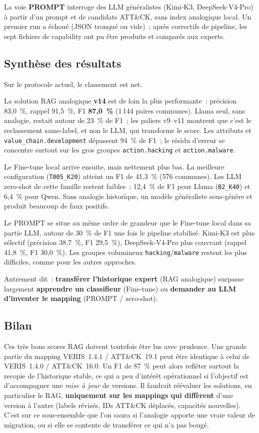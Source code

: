 \documentclass[a4paper,12pt]{article}
\begin{document}
La voie \textbf{PROMPT} interroge des LLM généralistes (Kimi-K3,
DeepSeek-V4-Pro) à partir d'un prompt et de candidats ATT\&CK, sans
index analogique local. Un premier run a échoué (JSON tronqué ou
vide)~; après correctifs de pipeline, les sept fichiers de capability
ont pu être produits et comparés aux experts.

\subsection{Synthèse des résultats}

Sur le protocole actuel, le classement est net.

La solution RAG analogique \textbf{v14} est de loin la plus
performante~: précision 83,0~\%, rappel 91,5~\%, F1 \textbf{87,0~\%}
(1\,144 paires communes). Llama seul, sans analogie, restait autour
de 23~\% de F1~; les paliers v9--v11 montrent que c'est le
reclassement same-label, et non le LLM, qui transforme le score. Les
attributs et \texttt{value\_chain.development} dépassent 94~\% de F1~;
le résidu d'erreur se concentre surtout sur les gros groupes
\texttt{action.hacking} et \texttt{action.malware}.

Le Fine-tune local arrive ensuite, mais nettement plus bas. La
meilleure configuration (\texttt{T005\_K20}) atteint un F1 de
41,3~\% (576 communes). Les LLM zero-shot de cette famille restent
faibles~: 12,4~\% de F1 pour Llama (\texttt{B2\_K40}) et 6,4~\% pour
Qwen. Sans analogie historique, un modèle généraliste sous-génère et
produit beaucoup de faux positifs.

Le PROMPT se situe au même ordre de grandeur que le Fine-tune local
dans sa partie LLM, autour de 30~\% de F1 une fois le pipeline
stabilisé. Kimi-K3 est plus sélectif (précision 38,7~\%, F1 29,5~\%),
DeepSeek-V4-Pro plus couvrant (rappel 41,8~\%, F1 30,0~\%). Les
groupes volumineux \texttt{hacking}/\texttt{malware} restent les plus
difficiles, comme pour les autres approches.

Autrement dit~: \textbf{transférer l'historique expert} (RAG
analogique) surpasse largement \textbf{apprendre un classifieur}
(Fine-tune) ou \textbf{demander au LLM d'inventer le mapping}
(PROMPT / zero-shot).

\subsection{Bilan}

Ces très bons scores RAG doivent toutefois être lus avec prudence.
Une grande partie du mapping VERIS~1.4.1 / ATT\&CK~19.1 peut être
identique à celui de VERIS~1.4.0 / ATT\&CK~16.0. Un F1 de 87~\% peut
alors refléter surtout la recopie de l'historique stable, ce qui a
peu d'intérêt opérationnel si l'objectif est d'accompagner une
\textit{mise à jour} de versions. Il faudrait réévaluer les solutions,
en particulier le RAG, \textbf{uniquement sur les mappings qui
diffèrent} d'une version à l'autre (labels révisés, IDs ATT\&CK
déplacés, capacités nouvelles). C'est sur ce sous-ensemble que l'on
saura si l'analogie apporte une vraie valeur de migration, ou si elle
se contente de transférer ce qui n'a pas bougé.
\end{document}
